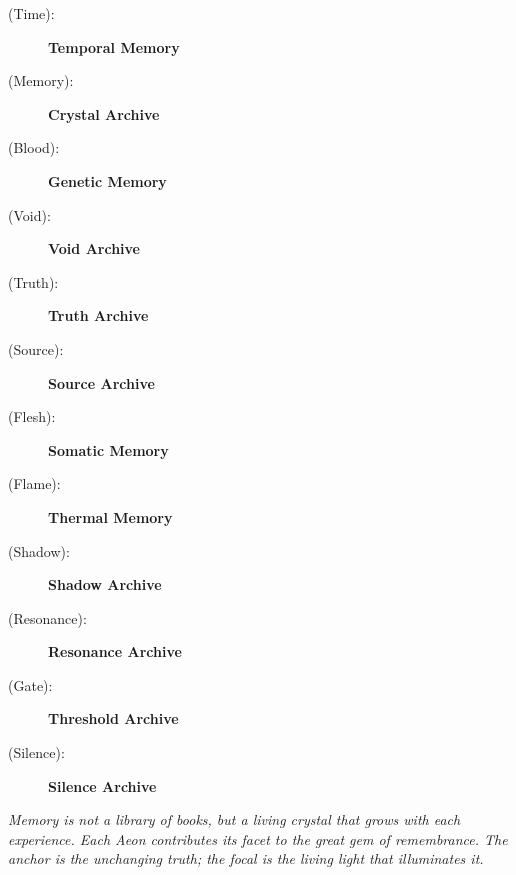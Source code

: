 \begin{description}
    \item[(Time):] \fetunerh {} \textbf{Temporal Memory} \\
    \item[(Memory):] \kalthar {} \textbf{Crystal Archive} \\
    \item[(Blood):] \babdhvar {} \textbf{Genetic Memory} \\
    \item[(Void):] \ahnloh {} \textbf{Void Archive} \\
    \item[(Truth):] \velghem {} \textbf{Truth Archive} \\
    \item[(Source):] \sorvaru {} \textbf{Source Archive} \\
    \item[(Flesh):] \kothlinn {} \textbf{Somatic Memory} \\
    \item[(Flame):] \drehnih {} \textbf{Thermal Memory} \\
    \item[(Shadow):] \rheather {} \textbf{Shadow Archive} \\
    \item[(Resonance):] \zhekharma {} \textbf{Resonance Archive} \\
    \item[(Gate):] \shavtran {} \textbf{Threshold Archive} \\
    \item[(Silence):] \trigduth {} \textbf{Silence Archive} \\
\end{description}

\textit{Memory is not a library of books, but a living crystal that grows with each experience. Each Aeon contributes its facet to the great gem of remembrance. The anchor is the unchanging truth; the focal is the living light that illuminates it.}

